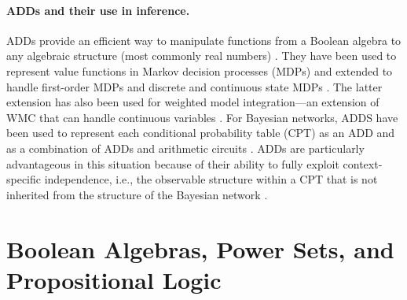\documentclass{article}
\begin{document}
\paragraph{ADDs and their use in inference.} ADDs provide an efficient way to
manipulate functions from a Boolean algebra to any algebraic structure (most
commonly real numbers) \cite{DBLP:journals/fmsd/BaharFGHMPS97}. They have been
used to represent value functions in Markov decision processes (MDPs)
\cite{DBLP:conf/uai/HoeySHB99} and extended to handle first-order MDPs
\cite{DBLP:journals/ai/SannerB09} and discrete and continuous state MDPs
\cite{DBLP:conf/uai/SannerDB11}. The latter extension has also been used for
weighted model integration---an extension of WMC that can handle continuous
variables \cite{DBLP:conf/ijcai/KolbMSBK18}. For Bayesian networks, ADDS have
been used to represent each conditional probability table (CPT) as an ADD
\cite{DBLP:conf/icml/ZhaoMP15} and as a combination of ADDs and arithmetic
circuits \cite{DBLP:conf/ijcai/ChaviraD07}. ADDs are particularly advantageous
in this situation because of their ability to fully exploit context-specific
independence, i.e., the observable structure within a CPT that is not inherited
from the structure of the Bayesian network \cite{DBLP:conf/uai/BoutilierFGK96}.

\section{Boolean Algebras, Power Sets, and Propositional
  Logic} \label{sec:prelims}
\end{document}
